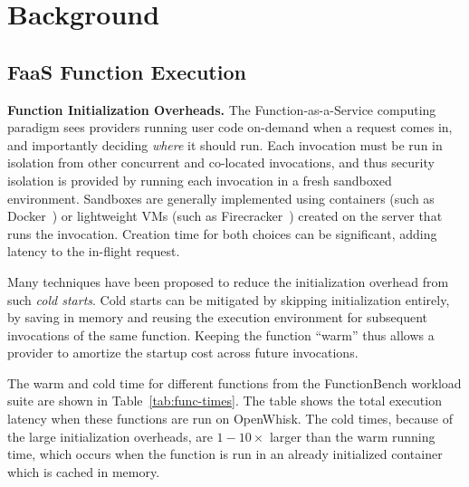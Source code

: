 
\section{Background}

\subsection{FaaS Function Execution} %

\noindent \textbf{Function Initialization Overheads.}
The Function-as-a-Service computing paradigm sees providers running user code on-demand when a request comes in, and importantly deciding \emph{where} it should run. 
Each invocation must be run in isolation from other concurrent and co-located invocations, and thus security isolation is provided by running each invocation in a fresh sandboxed environment. 
Sandboxes are generally implemented using containers (such as Docker~\cite{docker-main}) or lightweight VMs (such as Firecracker~\cite{firecracker-nsdi20}) created on the server that runs the invocation.
Creation time for both choices can be significant, adding latency to the in-flight request. 

Many techniques have been proposed to reduce the initialization overhead from such \emph{cold starts}.
Cold starts  can be mitigated by skipping initialization entirely, by saving in memory and reusing the execution environment for subsequent invocations of the same function. 
Keeping the function ``warm'' thus allows a provider to amortize the startup cost across future invocations. 

The warm and cold time for different functions from the FunctionBench \cite{kim_functionbench_2019} workload suite are shown in Table~\ref{tab:func-times}.
The table shows the total execution latency when these functions are run on OpenWhisk.
The cold times, because of the large initialization overheads, are $1-10\times$ larger than the warm running time, which occurs when the function is run in an already initialized container which is cached in memory. 


